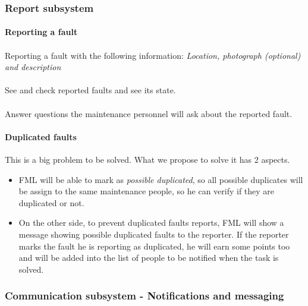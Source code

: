 \subsubsection{Report subsystem}

\paragraph{Reporting a fault}


\paragraph{} Reporting a fault with the following information: \textit{Location, photograph (optional) and description}

\paragraph{} See and check reported faults and see its state.

\paragraph{} Answer questions the maintenance personnel will ask about the reported fault.



\paragraph{Duplicated faults} This is a big problem to be solved. What we propose to solve it has 2 aspects.
\begin{itemize}
\item FML will be able to mark as \textit{possible duplicated}, so all possible duplicates will be assign to the same maintenance people, so he can verify if they are duplicated or not.

\item On the other side, to prevent duplicated faults reports, FML will show a message showing possible duplicated faults to the reporter. If the reporter marks the fault he is reporting as duplicated, he will earn some points too and will be added into the list of people to be notified when the task is solved.
\end{itemize}


\subsubsection{Communication subsystem - Notifications and messaging}

